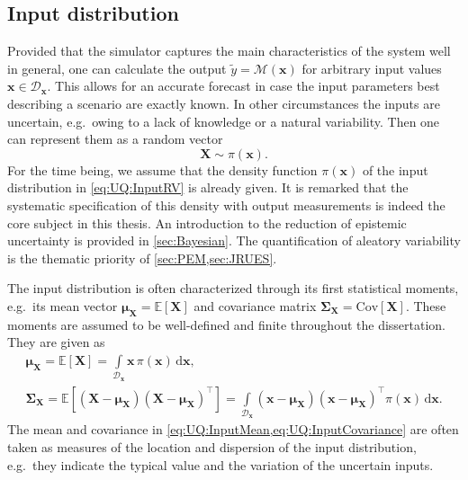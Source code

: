 \subsection{Input distribution}
Provided that the simulator captures the main characteristics of the system well in general,
one can calculate the output \(\tilde{y} = \mathcal{M}(\bm{x})\) for arbitrary input values \(\bm{x} \in \mathcal{D}_{\bm{x}}\).
This allows for an accurate forecast in case the input parameters best describing a scenario are exactly known.
In other circumstances the inputs are uncertain, e.g.\ owing to a lack of knowledge or a natural variability.
Then one can represent them as a random vector
\begin{equation} \label{eq:UQ:InputRV}
  \bm{X} \sim \pi(\bm{x}).
\end{equation}
For the time being, we assume that the density function \(\pi(\bm{x})\) of the input distribution in \cref{eq:UQ:InputRV} is already given.
It is remarked that the systematic specification of this density with output measurements is indeed the core subject in this thesis.
An introduction to the reduction of epistemic uncertainty is provided in \cref{sec:Bayesian}.
The quantification of aleatory variability is the thematic priority of \cref{sec:PEM,sec:JRUES}.
\par %
The input distribution is often characterized through its first statistical moments,
e.g.\ its mean vector \(\bm{\mu}_{\bm{X}} = \mathds{E}[\bm{X}]\) and covariance matrix \(\bm{\Sigma}_{\bm{X}} = \mathrm{Cov}[\bm{X}]\).
These moments are assumed to be well-defined and finite throughout the dissertation.
They are given as
\begin{gather}
  \bm{\mu}_{\bm{X}} = \mathds{E}[\bm{X}] = \int\limits_{\mathcal{D}_{\bm{x}}} \bm{x} \, \pi(\bm{x}) \, \mathrm{d} \bm{x}, \label{eq:UQ:InputMean} \\
  \bm{\Sigma}_{\bm{X}} = \mathds{E} \left[ \left( \bm{X} - \bm{\mu}_{\bm{X}} \right) \left( \bm{X} - \bm{\mu}_{\bm{X}} \right)^\top \right]
  = \int\limits_{\mathcal{D}_{\bm{x}}} \left( \bm{x} - \bm{\mu}_{\bm{X}} \right) \left( \bm{x} - \bm{\mu}_{\bm{X}} \right)^\top \pi(\bm{x}) \, \mathrm{d} \bm{x}. \label{eq:UQ:InputCovariance}
\end{gather}
The mean and covariance in \cref{eq:UQ:InputMean,eq:UQ:InputCovariance} are often taken as measures of the location and dispersion of the input distribution,
e.g.\ they indicate the typical value and the variation of the uncertain inputs.

